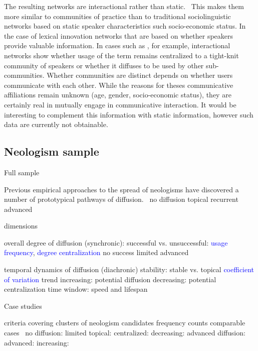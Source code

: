\documentclass[a4paper, abstract=on]{scrartcl}
\newcommand{\mtrc}[1]{\textcolor{blue}{#1}}
\begin{document}
    The resulting networks are interactional rather than static.~\parencite{Goel2016} This makes them more similar to communities of practice than to traditional sociolinguistic networks based on static speaker characteristics such socio-economic status.
      In the case of lexical innovation networks that are based on whether speakers provide valuable information. In cases such as , for example, interactional networks show whether usage of the term remains centralized to a tight-knit community of speakers or whether it diffuses to be used by other sub-communities.
        Whether communities are distinct depends on whether users communicate with each other. While the reasons for theses communicative affiliations remain unknown (age, gender, socio-economic status), they are certainly real in mutually engage in communicative interaction.
          It would be interesting to complement this information with static information, however such data are currently not obtainable.

  \subsection{Neologism sample}

    Full sample

      Previous empirical approaches to the spread of neologisms have discovered a number of prototypical pathways of diffusion.~\parencite{Kerremans2015}
        no diffusion
        topical
        recurrent
        advanced

      dimensions

        overall degree of diffusion (synchronic): successful vs. unsuccessful: \mtrc{usage frequency}, \mtrc{degree centralization}
          no success
          limited
          advanced

        temporal dynamics of diffusion (diachronic)
          stability: stable vs. topical \mtrc{coefficient of variation}
          trend
            increasing: potential diffusion
            decreasing: potential centralization
          time window: speed and lifespan

    Case studies

      criteria
        covering clusters of neologism candidates
        frequency counts comparable
      cases~\parencite{Kerremans2015}
        no diffusion: 
        limited
          topical: 
          centralized: 
          decreasing: 
        advanced diffusion:
          advanced: 
          increasing: 
\end{document}
